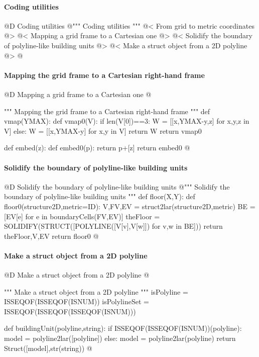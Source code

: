 \documentclass[11pt,oneside]{article}    %
\begin{document}
\paragraph{Coding utilities}
@D Coding utilities
@{""" Coding utilities """
@< From grid to metric coordinates @>
@< Mapping a grid frame to a Cartesian one @>
@< Solidify the boundary of polyline-like building units @>
@< Make a struct object from a 2D polyline @>
@}

\paragraph{Mapping the grid frame to a Cartesian right-hand frame}
@D Mapping a grid frame to a Cartesian one
@{""" Mapping the grid frame to a Cartesian right-hand frame """
def vmap(YMAX):
    def vmap0(V):
        if len(V[0])==3: W = [[x,YMAX-y,z] for x,y,z in V]
        else: W = [[x,YMAX-y] for x,y in V]
        return W
    return vmap0
                
def embed(z):
    def embed0(p): 
        return p+[z]
    return embed0
@}

\paragraph{Solidify the boundary of polyline-like building units}
@D Solidify the boundary of polyline-like building units
@{""" Solidify the boundary of polyline-like building units """
def floor(X,Y):
    def floor0(structure2D,metric=ID):
        V,FV,EV = struct2lar(structure2D,metric)
        BE = [EV[e] for e in boundaryCells(FV,EV)]
        theFloor = SOLIDIFY(STRUCT([POLYLINE([V[v],V[w]]) for v,w in BE]))
        return theFloor,V,EV
    return floor0
@}

\paragraph{Make a struct object from a 2D polyline}
@D Make a struct object from a 2D polyline
@{""" Make a struct object from a 2D polyline """
isPolyline = ISSEQOF(ISSEQOF(ISNUM))
isPolylineSet = ISSEQOF(ISSEQOF(ISSEQOF(ISNUM)))

def buildingUnit(polyline,string):
    if ISSEQOF(ISSEQOF(ISNUM))(polyline): model = polyline2lar([polyline])
    else: model = polyline2lar(polyline)
    return Struct([model],str(string))
@}
\end{document}
